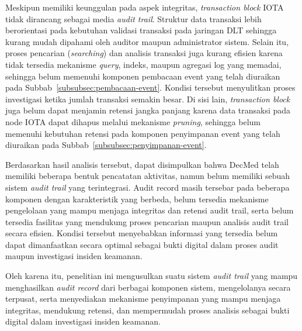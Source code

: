 Meskipun memiliki keunggulan pada aspek integritas, \textit{transaction block} IOTA tidak dirancang sebagai media \textit{audit trail}. Struktur data transaksi lebih berorientasi pada kebutuhan validasi transaksi pada jaringan DLT sehingga kurang mudah dipahami oleh auditor maupun administrator sistem. Selain itu, proses pencarian (\textit{searching}) dan analisis transaksi juga kurang efisien karena tidak tersedia mekanisme \textit{query}, indeks, maupun agregasi log yang memadai, sehingga belum memenuhi komponen pembacaan event yang telah diuraikan pada Subbab~\ref{subsubsec:pembacaan-event}. Kondisi tersebut menyulitkan proses investigasi ketika jumlah transaksi semakin besar. Di sisi lain, \textit{transaction block} juga belum dapat menjamin retensi jangka panjang karena data transaksi pada node IOTA dapat dihapus melalui mekanisme \textit{pruning}, sehingga belum memenuhi kebutuhan retensi pada komponen penyimpanan event yang telah diuraikan pada Subbab~\ref{subsubsec:penyimpanan-event}.

Berdasarkan hasil analisis tersebut, dapat disimpulkan bahwa DecMed telah memiliki beberapa bentuk pencatatan aktivitas, namun belum memiliki sebuah sistem \textit{audit trail} yang terintegrasi. Audit record masih tersebar pada beberapa komponen dengan karakteristik yang berbeda, belum tersedia mekanisme pengelolaan yang mampu menjaga integritas dan retensi audit trail, serta belum tersedia fasilitas yang mendukung proses pencarian maupun analisis audit trail secara efisien. Kondisi tersebut menyebabkan informasi yang tersedia belum dapat dimanfaatkan secara optimal sebagai bukti digital dalam proses audit maupun investigasi insiden keamanan.

Oleh karena itu, penelitian ini mengusulkan suatu sistem \textit{audit trail} yang mampu menghasilkan \textit{audit record} dari berbagai komponen sistem, mengelolanya secara terpusat, serta menyediakan mekanisme penyimpanan yang mampu menjaga integritas, mendukung retensi, dan mempermudah proses analisis sebagai bukti digital dalam investigasi insiden keamanan.








